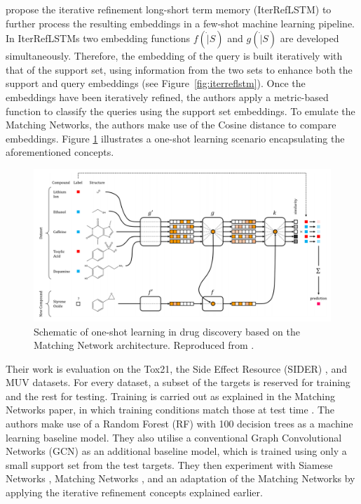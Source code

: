 \citet{altae2017low} propose the iterative refinement long-short term memory (IterRefLSTM) to further process the resulting embeddings in a few-shot machine learning pipeline. In IterRefLSTMs two embedding functions $f(\dot|S)$ and $g(\dot|S)$ are developed simultaneously. Therefore, the embedding of the query is built iteratively with that of the support set, using information from the two sets to enhance both the support and query embeddings (see Figure~\ref{fig:iterreflstm}). Once the embeddings have been iteratively refined, the authors apply a metric-based function to classify the queries using the support set embeddings. To emulate the Matching Networks, the authors make use of the Cosine distance to compare embeddings. Figure \ref{fig:schematiconeshotdrug} illustrates a one-shot learning scenario encapsulating the aforementioned concepts.

\begin{figure}[h]
	\centering
	\includegraphics[width=0.9\linewidth]{img/pandeschematic.png}
	\caption[Schematic of one-shot learning in drug discovery]{Schematic of one-shot learning in drug discovery based on the Matching Network \citep{vinyals2016matching} architecture. Reproduced from \citet{altae2017low}.}
	\label{fig:schematiconeshotdrug}
\end{figure}

Their work is evaluation on the Tox21, the Side Effect Resource (SIDER) \citep{kuhn2016sider}, and MUV datasets\citep{rohrer2009maximum}. For every dataset, a subset of the targets is reserved for training and the rest for testing. Training is carried out as explained in the Matching Networks paper, in which training conditions match those at test time \citep{vinyals2016matching}. The authors make use of a Random Forest (RF) with 100 decision trees as a machine learning baseline model. They also utilise a conventional Graph Convolutional Networks (GCN)\citep{kipf2016semi} as an additional baseline model, which is trained using only a small support set from the test targets. They then experiment with Siamese Networks \citep{koch2015siamese}, Matching Networks \citep{vinyals2016matching}, and an adaptation of the Matching Networks by applying the iterative refinement concepts explained earlier.

